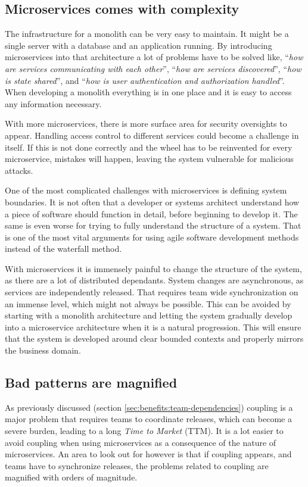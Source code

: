 \documentclass[a4paper]{article}
\begin{document}
\subsection{Microservices comes with complexity}
\label{sec:pitfalls:complexity}
The infrastructure for a monolith can be very easy to maintain. It might be a single server with a database and an application running. By introducing microservices into that architecture a lot of problems have to be solved like, ``\textit{how are services communicating with each other}'', ``\textit{how are services discovered}'', ``\textit{how is state shared}'', and ``\textit{how is user authentication and authorization handled}''. When developing a monolith everything is in one place and it is easy to access any information necessary.

With more microservices, there is more surface area for security oversights to appear. Handling access control to different services could become a challenge in itself. If this is not done correctly and the wheel has to be reinvented for every microservice, mistakes will happen, leaving the system vulnerable for malicious attacks.

One of the most complicated challenges with microservices is defining system boundaries. It is not often that a developer or systems architect understand how a piece of software should function in detail, before beginning to develop it. The same is even worse for trying to fully understand the structure of a system. That is one of the most vital arguments for using agile software development methods instead of the waterfall method.

With microservices it is immensely painful to change the structure of the system, as there are a lot of distributed dependants. System changes are asynchronous, as services are independently released. That requires team wide synchronization on an immense level, which might not always be possible. This can be avoided by starting with a monolith architecture and letting the system gradually develop into a microservice architecture when it is a natural progression. This will ensure that the system is developed around clear bounded contexts and properly mirrors the business domain. \cite{Fowler2015}

\subsection{Bad patterns are magnified}

As previously discussed (section \ref{sec:benefits:team-dependencies}) coupling is a major problem that requires teams to coordinate releases, which can become a severe burden, leading to a long \textit{Time to Market} (TTM). It is a lot easier to avoid coupling when using microservices as a consequence of the nature of microservices. An area to look out for however is that if coupling appears, and teams have to synchronize releases, the problems related to coupling are magnified with orders of magnitude.
\end{document}
